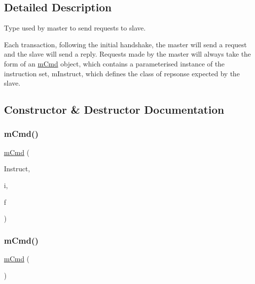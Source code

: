 \subsection{Detailed Description}
Type used by master to send requests to slave. 

Each transaction, following the initial handshake, the master will send a request and the slave will send a reply. Requests made by the master will always take the form of an \mbox{\hyperlink{structm_cmd}{m\+Cmd}} object, which contains a parameterised instance of the instruction set, m\+Instruct, which defines the class of repsonse expected by the slave. 

\subsection{Constructor \& Destructor Documentation}
\mbox{\label{structm_cmd_a15d47aa62e963ba62b9b5df21ff7c3b3}} 
\subsubsection{\texorpdfstring{mCmd()}{mCmd()}\hspace{0.1cm}{\footnotesize\ttfamily [1/3]}}
{\footnotesize\ttfamily \mbox{\hyperlink{structm_cmd}{m\+Cmd}} (\begin{DoxyParamCaption}\item[{\mbox{\hyperlink{_s_p_i___instruction_set_8h_afefab269eb3692ecb3e5fcdbb9440792}{m\+Instruct}}}]{Instruct,  }\item[{int}]{i,  }\item[{float}]{f }\end{DoxyParamCaption})\hspace{0.3cm}{\ttfamily [inline]}}

\mbox{\label{structm_cmd_a0bc6db1f094500a0605ce488869a1765}} 
\subsubsection{\texorpdfstring{mCmd()}{mCmd()}\hspace{0.1cm}{\footnotesize\ttfamily [2/3]}}
{\footnotesize\ttfamily \mbox{\hyperlink{structm_cmd}{m\+Cmd}} (\begin{DoxyParamCaption}{ }\end{DoxyParamCaption})\hspace{0.3cm}{\ttfamily [inline]}}

